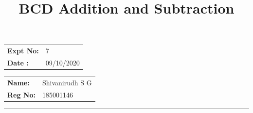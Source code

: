 \documentclass[10pt,a4paper]{article}
\title{\bf BCD Addition and Subtraction}
\author{\vspace{-10ex}}
\date{\vspace{-10ex}}
\begin{document}
\maketitle

\begin{minipage}{0.45\textwidth}
        \begin{tabular}{l l}
            \textbf{Expt No:}&7\\
            \textbf{Date :}&09/10/2020
        \end{tabular}
\end{minipage}%
\begin{minipage}{0.45\textwidth}
        \begin{tabular}{l l}
             \textbf{Name:}& Shivanirudh S G  \\
             \textbf{Reg No:} & 185001146 
        \end{tabular}
\end{minipage}
\vspace{1cm}
\hrule
\end{document}
